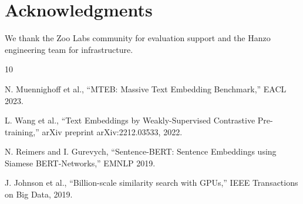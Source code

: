 \section*{Acknowledgments}


We thank the Zoo Labs community for evaluation support and the Hanzo engineering team for infrastructure.


\begin{thebibliography}{10}

N. Muennighoff et al., ``MTEB: Massive Text Embedding Benchmark,'' EACL 2023.

L. Wang et al., ``Text Embeddings by Weakly-Supervised Contrastive Pre-training,'' arXiv preprint arXiv:2212.03533, 2022.

N. Reimers and I. Gurevych, ``Sentence-BERT: Sentence Embeddings using Siamese BERT-Networks,'' EMNLP 2019.

J. Johnson et al., ``Billion-scale similarity search with GPUs,'' IEEE Transactions on Big Data, 2019.

\end{thebibliography}


